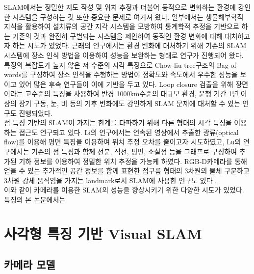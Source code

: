 \documentclass[master,korean,final]{cbnu-ecs}
\begin{document}
SLAM에서는 정밀한 지도 작성 및 위치 추정과 더불어 동적으로 변화하는 환경에 강인한 시스템을 구성하는 것 또한 중요한 문제로 여겨져 왔다. 일부에서는 생물해부학적 지식을 활용하여 설치류의 공간 지각 시스템을 모방하여 통계학적 추정을 기반으로 하는 기존의 것과 완전히 구별되는 시스템을 제안하여 동적인 환경 변화에 대해 대처하고자 하는 시도가 있었다\cite{Milford2008}. 근래의 연구에서는 환경 변화에 대처하기 위해 기존의 SLAM시스템에 장소 인식 방법을 이용하여 성능을 보완하는 형태로 연구가 진행되어 왔다. 특징의 복잡도가 높지 않은 저 수준의 시각 특징으로 Chow-liu tree구조의 Bag-of-words를 구성하여 장소 인식을 수행하는 방법\cite{Cummins2011}이 정확도와 속도에서 우수한 성능을 보이고 있어 많은 후속 연구들이 이에 기반을 두고 있다. Loop closure 검출을 위해 장면이라는 고수준의 특징을 사용하여 반경 1000km수준의 대규모 환경, 운행 기간 1년 이상의 장기 구동, 눈, 비 등의 기후 변화에도 강인하게 SLAM 문제에 대처할 수 있는 연구도 진행되었다\cite{Milford2012}.\\
점 특징 기반의 SLAM이 가지는 한계를 타파하기 위해 다른 형태의 시각 특징을 이용하는 접근도 연구되고 있다. Li의 연구에서는 연속된 영상에서 추출한 광류(optical flow)를 이용해 평면 특징을 이용하여 위치 추정 오차를 줄이고자 시도하였고\cite{Li2014}, Lu의 연구에서는 기존의 점 특징과 함께 선분, 직선, 평면, 소실점 등을 그래프로 구성하여 추가된 기하 정보를 이용하여 정밀한 위치 추정을 가능케 하였다\cite{Lu2015}. RGB-D카메라를 통해 얻을 수 있는 추가적인 공간 정보를 함께 표현한 점구름 형태의 3차원의 물체 구분하고 3차원 강체 움직임을 가지는 landmark로서 SLAM에 사용한 연구도 있다\cite{Moreno2013} .\\
이와 같이 카메라를 이용한 SLAM의 성능을 향상시키기 위한 다양한 시도가 있었다. 특징의 
본 논문에서는 

\chapter{사각형 특징 기반 Visual SLAM}
\section{카메라 모델}
\section{}
\end{document}
